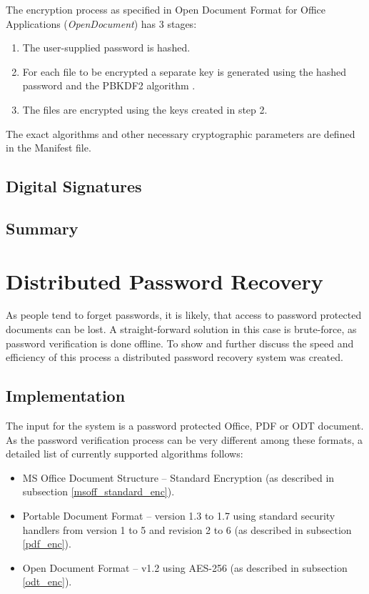 \documentclass[11pt,oneside]{fithesis2}
\begin{document}
The encryption process as specified in Open Document Format for Office Applications (\textit{OpenDocument}) \cite{odt_spec} has 3 stages:

\begin{enumerate}
\setlength\itemsep{0.1em}
	\item{The user-supplied password is hashed.}
	\item{For each file to be encrypted a separate key is generated using the hashed password and the PBKDF2 algorithm \cite{rfc2898}.}
	\item{The files are encrypted using the keys created in step 2.}
\end{enumerate}

The exact algorithms and other necessary cryptographic parameters are defined in the Manifest file.


\section{Digital Signatures}

\section{Summary}

\chapter{Distributed Password Recovery}

As people tend to forget passwords, it is likely, that access to password protected documents can be lost. A straight-forward solution in this case is brute-force, as password verification is done offline. To show and further discuss the speed and efficiency of this process a distributed password recovery system was created.

\section{Implementation}

The input for the system is a password protected Office, PDF or ODT document. As the password verification process can be very different among these formats, a detailed list of currently supported algorithms follows:

\begin{itemize}
\setlength\itemsep{0.1em}
	\item{MS Office Document Structure -- Standard Encryption (as described in subsection \ref{msoff_standard_enc}).}
	\item{Portable Document Format --  version 1.3 to 1.7 using standard security handlers from version 1 to 5 and revision 2 to 6 (as described in subsection \ref{pdf_enc}).}
	\item{Open Document Format – v1.2 using AES-256 (as described in subsection \ref{odt_enc}).}
\end{itemize}
\end{document}
